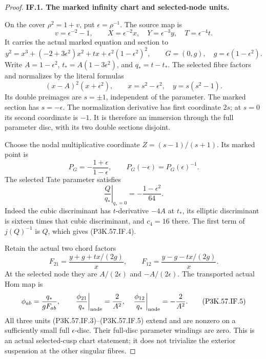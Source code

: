 \begin{proof}
\par\medskip\noindent\textbf{IF.1. The marked infinity chart and selected-node units.}\par\nopagebreak[4]

On the cover \(\rho^2=1+v\), put \(\epsilon=\rho^{-1}\). The source map is
\[
 v=\epsilon^{-2}-1,\qquad
 X=\epsilon^{-2}x,\quad Y=\epsilon^{-3}y,\quad T=\epsilon^{-4}t.
\]
It carries the actual marked equation and section to
\[
 y^2=x^3+(-2+3\epsilon^2)x^2+t x
                     +\epsilon^2(1-\epsilon^2)^2,\qquad
 G=(0,g),\quad g=\epsilon(1-\epsilon^2).                 \tag{P3K.57.IF.1}
\]
Write \(A=1-\epsilon^2\), \(t_*=A(1-3\epsilon^2)\), and \(q_*=t-t_*\).
The selected fibre factors and normalizes by the literal formulas
\[
 (x-A)^2(x+\epsilon^2),\qquad
 x=s^2-\epsilon^2,\quad y=s(s^2-1).                     \tag{P3K.57.IF.2}
\]
Its double preimages are \(s=\pm1\), independent of the parameter. The marked
section has \(s=-\epsilon\). The normalization derivative has first coordinate
\(2s\); at \(s=0\) its second coordinate is \(-1\). It is therefore an immersion
through the full parameter disc, with its two double sections disjoint.

Choose the nodal multiplicative coordinate \(Z=(s-1)/(s+1)\). Its marked point
is
\[
 P_G=-\frac{1+\epsilon}{1-\epsilon},\qquad
 P_G(-\epsilon)=P_G(\epsilon)^{-1}.                    \tag{P3K.57.IF.3}
\]
The selected Tate parameter satisfies
\[
 \left.\frac{Q}{q_*}\right|_{q_*=0}
       =-\frac{1-\epsilon^2}{64}.                       \tag{P3K.57.IF.4}
\]
Indeed the cubic discriminant has \(t\)-derivative \(-4A\) at \(t_*\), its
elliptic discriminant is sixteen times that cubic discriminant, and \(c_4=16\)
there. The first term of \(j(Q)^{-1}\) is \(Q\), which gives (P3K.57.IF.4).

Retain the actual two chord factors
\[
 F_{21}=\frac{y+g+t x/(2g)}x,\qquad
 F_{12}=\frac{y-g-t x/(2g)}x .
\]
At the selected node they are \(A/(2\epsilon)\) and
\(-A/(2\epsilon)\). The transported actual Hom map is
\[
 \phi_{ab}=\frac{q_*}{g F_{ab}},\qquad
 \left.\frac{\phi_{21}}{q_*}\right|_{\rm node}=\frac2{A^2},
 \quad
 \left.\frac{\phi_{12}}{q_*}\right|_{\rm node}=-\frac2{A^2}.       \tag{P3K.57.IF.5}
\]
All three units (P3K.57.IF.3)--\allowbreak (P3K.57.IF.5) extend and are nonzero on a sufficiently small
full \(\epsilon\)-disc. Their full-disc parameter windings are zero. This is
an actual selected-cusp chart statement; it does not trivialize the exterior
suspension at the other singular fibres.


\end{proof}
